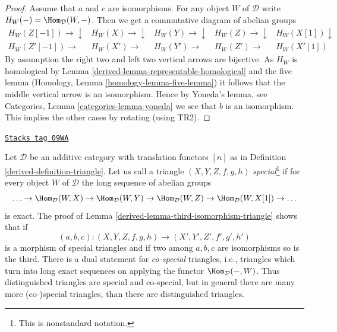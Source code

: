 \begin{proof}

Assume that $a$ and $c$ are isomorphisms.
For any object $W$ of $\mathcal{D}$ write
$H_W( - ) = \Hom_\mathcal{D}(W, -)$.
Then we get a commutative diagram of abelian groups
$$
\begin{array}{ccccc}H_W(Z[-1]) \longrightarrow\downarrow & H_W(X) \longrightarrow\downarrow & H_W(Y) \longrightarrow\downarrow & H_W(Z) \longrightarrow\downarrow & H_W(X[1]) \downarrow \\ H_W(Z'[-1]) \longrightarrow & H_W(X') \longrightarrow & H_W(Y') \longrightarrow & H_W(Z') \longrightarrow & H_W(X'[1])\end{array}
$$
By assumption the right two and left two vertical arrows are bijective.
As $H_W$ is homological by
Lemma \ref{derived-lemma-representable-homological}
and the five lemma
(Homology, Lemma \ref{homology-lemma-five-lemma})
it follows that the middle vertical arrow is an isomorphism.
Hence by Yoneda's lemma, see
Categories, Lemma \ref{categories-lemma-yoneda}
we see that $b$ is an isomorphism.
This implies the other cases by rotating (using TR2).
\end{proof}

\begin{remark}
\label{derived-remark-special-triangles}
\href{https://stacks.math.columbia.edu/tag/09WA}{\texttt{Stacks tag 09WA}}

Let $\mathcal{D}$ be an additive category with translation functors $[n]$
as in Definition \ref{derived-definition-triangle}. Let us call a triangle
$(X, Y, Z, f, g, h)$ {\it special}\footnote{This is nonstandard notation.}
if for every object $W$ of $\mathcal{D}$
the long sequence of abelian groups
$$
\ldots \to
\Hom_\mathcal{D}(W, X) \to
\Hom_\mathcal{D}(W, Y) \to
\Hom_\mathcal{D}(W, Z) \to
\Hom_\mathcal{D}(W, X[1]) \to \ldots
$$
is exact.  The proof of Lemma \ref{derived-lemma-third-isomorphism-triangle}
shows that if
$$
(a, b, c) : (X, Y, Z, f, g, h) \to (X', Y', Z', f', g', h')
$$
is a morphism of special triangles and if two among $a, b, c$
are isomorphisms so is the third. There is a dual statement for
{\it co-special} triangles, i.e., triangles which turn into long
exact sequences on applying the functor $\Hom_\mathcal{D}(-, W)$.
Thus distinguished triangles are special and co-special, but in
general there are many more (co-)special triangles, than there are
distinguished triangles.
\end{remark}

